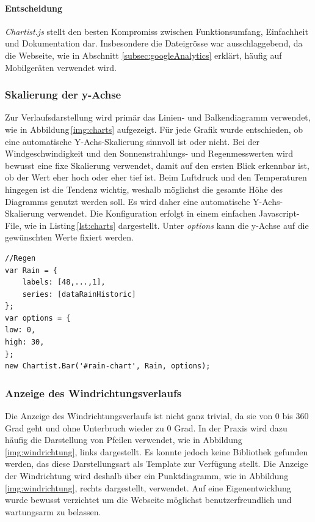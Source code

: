 \paragraph*{Entscheidung}
\emph{Chartist.js} stellt den besten Kompromiss zwischen Funktionsumfang, Einfachheit und Dokumentation dar. Insbesondere die Dateigrösse war ausschlaggebend, da die Webseite, wie in Abschnitt \ref{subsec:googleAnalytics} erklärt, häufig auf Mobilgeräten verwendet wird.


\subsubsection{Skalierung der y-Achse}
Zur Verlaufsdarstellung wird primär das Linien- und Balkendiagramm verwendet, wie in Abbildung\,\ref{img:charts} aufgezeigt. Für jede Grafik wurde entschieden, ob eine automatische Y-Achs-Skalierung sinnvoll ist oder nicht. Bei der Windgeschwindigkeit und den Sonnenstrahlungs- und Regenmesswerten wird bewusst eine fixe Skalierung verwendet, damit auf den ersten Blick erkennbar ist, ob der Wert eher hoch oder eher tief ist. Beim Luftdruck und den Temperaturen hingegen ist die Tendenz wichtig, weshalb möglichst die gesamte Höhe des Diagramms genutzt werden soll. Es wird daher eine automatische Y-Achs-Skalierung verwendet. Die Konfiguration erfolgt in einem einfachen Javascript-File, wie in Listing\,\ref{lst:charts}  dargestellt. Unter \emph{options} kann die y-Achse auf die gewünschten Werte fixiert werden.

\begin{lstlisting}[label=lst:charts,caption=Konfiguration eines Verlaufsdiagramms, language=HTML5, style=htmlcssjs]
//Regen
var Rain = {
	labels: [48,...,1],
	series: [dataRainHistoric]
};
var options = {
low: 0,
high: 30,
};
new Chartist.Bar('#rain-chart', Rain, options);
\end{lstlisting}



\subsubsection{Anzeige des Windrichtungsverlaufs}
Die Anzeige des Windrichtungsverlaufs ist nicht ganz trivial, da sie von 0 bis 360 Grad geht und ohne Unterbruch wieder zu 0 Grad. In der Praxis wird dazu häufig die Darstellung von Pfeilen verwendet, wie in Abbildung\,\ref{img:windrichtung}, links dargestellt. Es konnte jedoch keine Bibliothek gefunden werden, das diese Darstellungsart als Template zur Verfügung stellt. Die Anzeige der Windrichtung wird deshalb über ein Punktdiagramm, wie in Abbildung\,\ref{img:windrichtung}, rechts dargestellt, verwendet. Auf eine Eigenentwicklung wurde bewusst verzichtet um die Webseite möglichst benutzerfreundlich und wartungsarm zu belassen.

